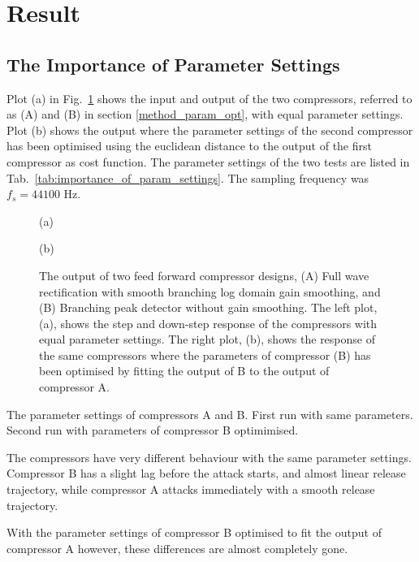 \documentclass[../main2.tex]{subfiles}
\providecommand{\rootdir}{..}
\begin{document}
\section{Result}\label{results}

\subsection{The Importance of Parameter Settings}
Plot (a) in Fig.~\ref{fig:param_opt} shows the input and output of the two compressors, referred to as (A) and (B) in section \ref{method_param_opt}, with equal parameter settings. Plot (b) shows the output where the parameter settings of the second compressor has been optimised using the euclidean distance to the output of the first compressor as cost function. The parameter settings of the two tests are listed in Tab.~\ref{tab:importance_of_param_settings}. The sampling frequency was $f_s = 44100$ Hz.

\begin{figure}[ht]
\captionsetup*{justification=centering}
\begin{minipage}[t]{.5\textwidth}
 \centering

\caption*{(a)} 
\label{fig:param_opt_left}
\end{minipage}%
\begin{minipage}[t]{.5\textwidth}
\centering

\caption*{(b)} 
\label{fig:param_opt_right}
\end{minipage}
\caption{The output of two feed forward compressor designs, (A) Full wave rectification with smooth branching log domain gain smoothing, and (B) Branching peak detector without gain smoothing. The left plot, (a), shows the step and down-step response of the compressors with equal parameter settings. The right plot, (b), shows the response of the same compressors where the parameters of compressor (B) has been optimised by fitting the output of B to the output of compressor A.}
\label{fig:param_opt}
\end{figure}

\begin{table}[h]
\small
\begin{center}
\caption{The parameter settings of compressors A and B. First run with same parameters. Second run with parameters of compressor B optimimised.}
\label{tab:importance_of_param_settings}

\end{center}
\end{table}

The compressors have very different behaviour with the same parameter settings. Compressor B has a slight lag before the attack starts, and almost linear release trajectory, while compressor A attacks immediately with a smooth release trajectory.

With the parameter settings of compressor B optimised to fit the output of compressor A however, these differences are almost completely gone. 

\FloatBarrier

\FloatBarrier
\end{document}
